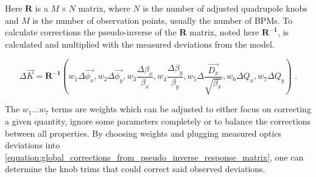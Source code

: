 Here \(\mathbf{R}\) is a \(M \times N\) matrix, where \(N\) is the number of adjusted quadrupole knobs and \(M\) is the number of observation points, usually the number of BPMs.
To calculate corrections the pseudo-inverse of the \(\mathbf{R}\) matrix, noted here \(\mathbf{R^{-1}}\), is calculated and multiplied with the measured deviations from the model.

\begin{equation}
  \Delta \vec{K} = \mathbf{R^{-1}} \left(w_1 \Delta \overrightarrow{\phi_x}, w_2 \Delta \overrightarrow{\phi_y}, w_3 \frac{\Delta \beta_x}{\beta_x}, w_4 \frac{\Delta \beta_y}{\beta_y}, w_5 \Delta \frac{\overrightarrow{D_x}}{\sqrt{\beta_x}}, w_6 \Delta Q_x, w_7 \Delta Q_y \right) \text{ .}
  \label{equation:global_corrections_from_pseudo_inverse_response_matrix}
\end{equation}

The \(w_1 \ldots w_7\) terms are weights which can be adjusted to either focus on correcting a given quantity, ignore some parameters completely or to balance the corrections between all properties.
By choosing weights and plugging measured optics deviations into \cref{equation:global_corrections_from_pseudo_inverse_response_matrix}, one can determine the knob trims that could correct said observed deviations.

\glsresetall                                     %
